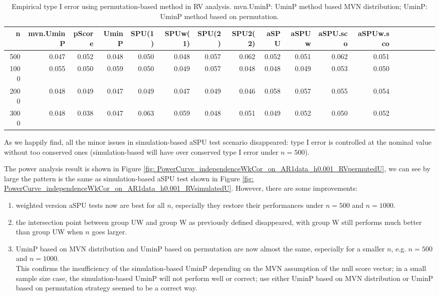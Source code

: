 \documentclass[12pt]{article}
\begin{document}
\begin{itemize}
\begin{table}[ht]
\resizebox{0.8\textwidth}{!}
{\begin{minipage}{\textwidth}
\centering
\begin{tabular}{rrrrrrrrrrrrrrrrrr}
  \hline
n &  mvn.UminP & pScore & UminP & SPU(1) & SPUw(1) & SPU(2) & SPU2(2) & aSPU & aSPUw & aSPU.sco & aSPUw.sco \\
  \hline
500   & 0.047 & 0.052 & 0.048 & 0.050 & 0.048 & 0.057 & 0.062  & 0.052 & 0.051 & 0.062 & 0.051 \\
1000  & 0.055 & 0.050 & 0.059 & 0.050 & 0.049 & 0.057 & 0.048  & 0.048 & 0.049 & 0.053 & 0.050 \\
2000  & 0.048 & 0.049 & 0.047 & 0.049 & 0.047 & 0.049 & 0.046  & 0.058 & 0.057 & 0.055 & 0.054 \\
3000  & 0.048 & 0.038 & 0.047 & 0.063 & 0.059 & 0.048 & 0.051  & 0.049 & 0.052 & 0.050 & 0.052 \\
   \hline
\end{tabular}
\caption{Empirical type I error using permutation-based method in RV analysis. mvn.UminP: UminP method based MVN distribution; UminP: UminP method based on permutation.  \label{table:Empirical type I error using permutation-based method in RV analysis}}
\end{minipage}}
\end{table}

As we happily find, all the minor issues in simulation-based aSPU test scenario disappeared: type I error is controlled at the nominal value without too conserved ones (simulation-based will have over conserved type I error under $n = 500$).

The power analysis result is shown in Figure \ref{fig: PowerCurve_independenceWkCor_on_AR1data_h0.001_RVpermutedU}, we can see by large the pattern is the same as simulation-based aSPU test shown in Figure \ref{fig: PowerCurve_independenceWkCor_on_AR1data_h0.001_RVsimulatedU}. However, there are some improvements: 
\begin{enumerate}
\item  weighted version aSPU tests now are best for all $n$, especially they restore their performances under $n = 500$ and $n = 1000$.
\item the intersection point between group UW and group W as previously defined disappeared, with group W still performs much better than group UW when $n$ goes larger.
\item UminP based on MVN distribution and UminP based on permutation are now almost the same, especially for a smaller $n$, e.g. $n = 500$ and $n = 1000$. \\
This confirms the insufficiency of the simulation-based UminP depending on the MVN assumption of the null score vector; in a small sample size case, the simulation-based UminP will not perform well or correct; use either UminP based on MVN distribution or UminP based on permutation strategy seemed to be a correct way.
\end{enumerate}


\end{itemize}
\end{document}
